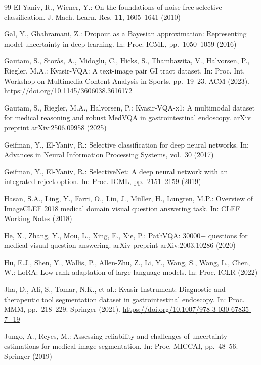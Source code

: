 \documentclass[pdflatex,sn-mathphys-num]{sn-jnl}
\begin{document}
\begin{thebibliography}{99}
El-Yaniv, R., Wiener, Y.: On the foundations of noise-free selective classification. J. Mach. Learn. Res. \textbf{11}, 1605--1641 (2010)

Gal, Y., Ghahramani, Z.: Dropout as a Bayesian approximation: Representing model uncertainty in deep learning. In: Proc. ICML, pp.~1050--1059 (2016)

Gautam, S., Stor{\aa}s, A., Midoglu, C., Hicks, S., Thambawita, V., Halvorsen, P., Riegler, M.A.: Kvasir-VQA: A text-image pair GI tract dataset. In: Proc. Int. Workshop on Multimedia Content Analysis in Sports, pp.~19--23. ACM (2023). \url{https://doi.org/10.1145/3606038.3616172}

Gautam, S., Riegler, M.A., Halvorsen, P.: Kvasir-VQA-x1: A multimodal dataset for medical reasoning and robust MedVQA in gastrointestinal endoscopy. arXiv preprint arXiv:2506.09958 (2025)

Geifman, Y., El-Yaniv, R.: Selective classification for deep neural networks. In: Advances in Neural Information Processing Systems, vol.~30 (2017)

Geifman, Y., El-Yaniv, R.: SelectiveNet: A deep neural network with an integrated reject option. In: Proc. ICML, pp.~2151--2159 (2019)

Hasan, S.A., Ling, Y., Farri, O., Liu, J., M{\"u}ller, H., Lungren, M.P.: Overview of ImageCLEF 2018 medical domain visual question answering task. In: CLEF Working Notes (2018)

He, X., Zhang, Y., Mou, L., Xing, E., Xie, P.: PathVQA: 30000+ questions for medical visual question answering. arXiv preprint arXiv:2003.10286 (2020)

Hu, E.J., Shen, Y., Wallis, P., Allen-Zhu, Z., Li, Y., Wang, S., Wang, L., Chen, W.: LoRA: Low-rank adaptation of large language models. In: Proc. ICLR (2022)

Jha, D., Ali, S., Tomar, N.K., et al.: Kvasir-Instrument: Diagnostic and therapeutic tool segmentation dataset in gastrointestinal endoscopy. In: Proc. MMM, pp.~218--229. Springer (2021). \url{https://doi.org/10.1007/978-3-030-67835-7\_19}

Jungo, A., Reyes, M.: Assessing reliability and challenges of uncertainty estimations for medical image segmentation. In: Proc. MICCAI, pp.~48--56. Springer (2019)


\end{thebibliography}
\end{document}
